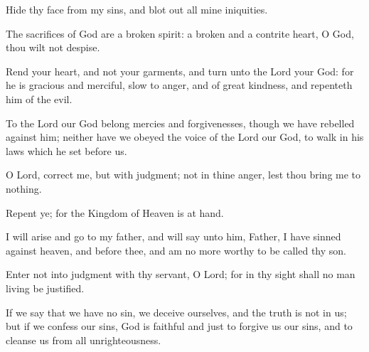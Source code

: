 \begin{multicols}{2}
    Hide thy face from my sins, and blot out all mine iniquities.\par

    The sacrifices of God are a broken spirit: a broken and a contrite heart, O God, thou wilt not despise.\par

    Rend your heart, and not your garments, and turn unto the Lord your God: for he is gracious and merciful, slow to anger, and of great kindness, and repenteth him of the evil.\par

    To the Lord our God belong mercies and forgivenesses, though we have rebelled against him; neither have we obeyed the voice of the Lord our God, to walk in his laws which he set before us.\par

    O Lord, correct me, but with judgment; not in thine anger, lest thou bring me to nothing.\par

    Repent ye; for the Kingdom of Heaven is at hand.\par

    I will arise and go to my father, and will say unto him, Father, I have sinned against heaven, and before thee, and am no more worthy to be called thy son.\par

    Enter not into judgment with thy servant, O Lord; for in thy sight shall no man living be justified.\par

    If we say that we have no sin, we deceive ourselves, and the truth is not in us; but if we confess our sins, God is faithful and just to forgive us our sins, and to cleanse us from all unrighteousness.\\
    

\end{multicols}
